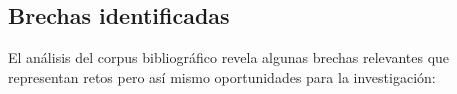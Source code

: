 


\subsection{Brechas identificadas}
El análisis del corpus bibliográfico revela algunas brechas relevantes que representan retos pero así mismo oportunidades para la investigación:

